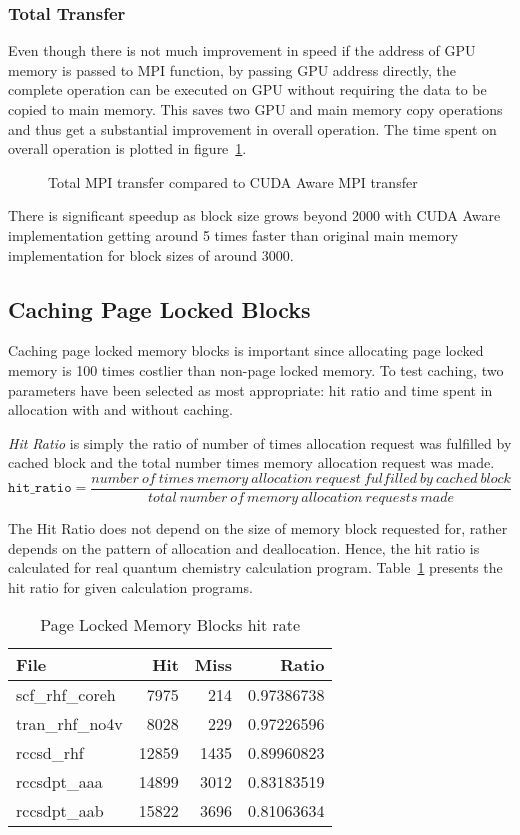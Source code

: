 \subsubsection{Total Transfer}
Even though there is not much improvement in speed if the address of GPU memory is
passed to MPI function, by passing GPU address directly, the complete operation
can be executed on GPU without requiring the data to be copied to main memory. This
saves two GPU and main memory copy operations and thus get a substantial improvement
in overall operation. The time spent on overall operation is plotted in
figure~\ref{fig:mempin_rdma_total}.

\begin{figure}[h]
  
  \caption{Total MPI transfer compared to CUDA Aware MPI transfer}
  \label{fig:mempin_rdma_total}
\end{figure}

There is significant speedup as block size grows beyond 2000 with CUDA Aware
implementation getting around 5 times faster than original main memory implementation
for block sizes of around 3000.

\subsection{Caching Page Locked Blocks}
Caching page locked memory blocks is important since allocating page locked memory
is 100 times costlier than non-page locked memory. To test caching, two parameters
have been selected as most appropriate: hit ratio and time spent in allocation with
and without caching.

\textit{Hit Ratio} is simply the ratio of number of times allocation request was
fulfilled by cached block and the total number times memory allocation request
was made.
\[
  \texttt{hit\_ratio} = \frac{number~of~times~memory~allocation~request~fulfilled~by~cached~block}{total~number~of~memory~allocation~requests~made}
\]

The Hit Ratio does not depend on the size of memory block requested for, rather
depends on the pattern of allocation and deallocation. Hence, the hit ratio is calculated
for real quantum chemistry calculation program. Table~\ref{tab:mempin_hitrate}
presents the hit ratio for given calculation programs.

\begin{table}[h]
  \centering
  \caption{Page Locked Memory Blocks hit rate}
  \begin{tabular}{l r r r}
    \hline
    File            & Hit   & Miss & Ratio      \\
    \hline
    scf\_rhf\_coreh &  7975 &  214 & 0.97386738 \\
    tran\_rhf\_no4v &  8028 &  229 & 0.97226596 \\
    rccsd\_rhf      & 12859 & 1435 & 0.89960823 \\
    rccsdpt\_aaa    & 14899 & 3012 & 0.83183519 \\
    rccsdpt\_aab    & 15822 & 3696 & 0.81063634 \\
    \hline
  \end{tabular}
  \label{tab:mempin_hitrate}
\end{table}

